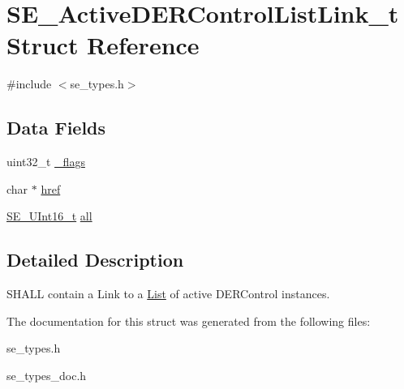 \hypertarget{structSE__ActiveDERControlListLink__t}{}\section{S\+E\+\_\+\+Active\+D\+E\+R\+Control\+List\+Link\+\_\+t Struct Reference}
\label{structSE__ActiveDERControlListLink__t}


{\ttfamily \#include $<$se\+\_\+types.\+h$>$}

\subsection*{Data Fields}
\begin{DoxyCompactItemize}
\item 
uint32\+\_\+t \hyperlink{group__ActiveDERControlListLink_gaeecb69aecac21e9415585eb108272309}{\+\_\+flags}
\item 
char $\ast$ \hyperlink{group__ActiveDERControlListLink_gad2afedb20cb4a7d70e5fb38623cd10c7}{href}
\item 
\hyperlink{group__UInt16_gac68d541f189538bfd30cfaa712d20d29}{S\+E\+\_\+\+U\+Int16\+\_\+t} \hyperlink{group__ActiveDERControlListLink_ga5207254c0fefaa2e950d854bd911ede8}{all}
\end{DoxyCompactItemize}


\subsection{Detailed Description}
S\+H\+A\+LL contain a Link to a \hyperlink{structList}{List} of active D\+E\+R\+Control instances. 

The documentation for this struct was generated from the following files\+:\begin{DoxyCompactItemize}
\item 
se\+\_\+types.\+h\item 
se\+\_\+types\+\_\+doc.\+h\end{DoxyCompactItemize}
